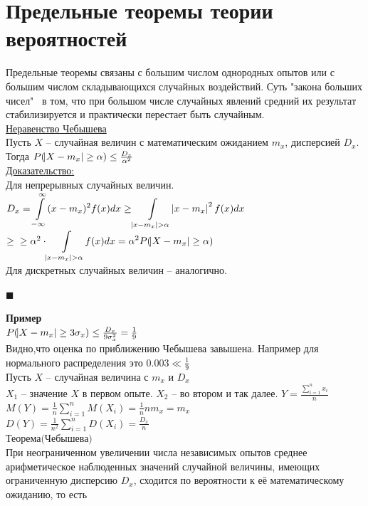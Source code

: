 \documentclass[russian, 12pt, fleqn,x11names]{article}
\begin{document}
\section{Предельные теоремы теории вероятностей}
\noindent
Предельные теоремы связаны с большим числом однородных опытов или с большим числом складывающихся случайных воздействий. Суть "закона больших чисел"  \ в том, что при большом числе случайных явлений средний их результат стабилизируется и практически перестает быть случайным.\\
\underline{Неравенство Чебышева}\\
Пусть $X$ -- случайная величин с математическим ожиданием $m_x$, дисперсией $D_x$.\\
Тогда $P(\abs{X - m_x} \geq \alpha) \leq \frac{D_x}{\alpha^2}$\\
\underline{Доказательство:}\\
Для непрерывных случайных величин. \\
$D_x =  \displaystyle{\int\limits_{-\infty}^{\infty} }(x-m_x)^2 f(x) dx \geq \displaystyle{\int\limits_{\abs{x - m_x} > \alpha} } \abs{x-m_x}^2 f(x) dx$
$\geq  \\ \geq \alpha^2  \cdot \displaystyle{\int\limits_{\abs{x - m_x} > \alpha} }f(x) dx = \alpha^2 P(\abs{X - m_x} \geq \alpha)$ \\
Для дискретных случайных величин -- аналогично. \begin{flushright}\(\blacksquare\)\end{flushright}
\textbf{Пример} \\
$P(\abs{X - m_x} \geq  3 \sigma_x) \leq  \frac{D_x}{9\sigma_x^2} = \frac{1}{9}$\\
Видно,что оценка по  приближению Чебышева  завышена.  Например для нормального распределения это $0.003 \ll \frac{1}{9}$\\
Пусть $X$ -- случайная величина с $m_x$  и $D_x$\\
$X_1$ -- значение $X$ в первом опыте. $X_2$ -- во втором и так далее. $Y = \frac{\displaystyle{\sum\limits_{i = 1}  ^ {n} x_i}}{n}$ $M(Y) = \frac{1}{n} \displaystyle{\sum\limits_{i = 1}^{n}} M(X_i) = \frac{1}{n} n m_x = m_x$\\
$D(Y)  = \frac{1}{n^2}\displaystyle{\sum\limits_{i = 1}^{n}} D(X_i) = \frac{D_x}{n}$\\
$\textbf{Теорема(Чебышева)}$\\
При неограниченном увеличении числа независимых опытов  среднее \\ арифметическое наблюденных значений случайной величины, имеющих ограниченную дисперсию $D_x$, сходится по вероятности к её математическому ожиданию, то есть
\end{document}
